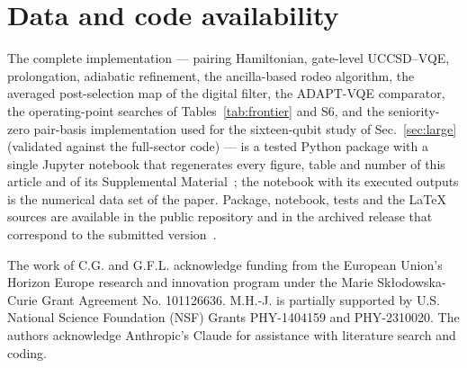 \documentclass[
  aps,            %
  prc,            %
  reprint,        %
  superscriptaddress,
  floatfix,
  nofootinbib
]{revtex4-2}
\newcommand{\SM}{Supplemental Material~\cite{SM}}
\begin{document}
\section*{Data and code availability}
The complete implementation --- pairing Hamiltonian, gate-level UCCSD--VQE,
prolongation, adiabatic refinement, the ancilla-based rodeo algorithm, the
averaged post-selection map of the digital filter, the ADAPT-VQE
comparator, the operating-point searches of Tables~\ref{tab:frontier} and
S6, and the seniority-zero pair-basis implementation used for the
sixteen-qubit study of Sec.~\ref{sec:large} (validated against the
full-sector code) --- is a tested Python package with a single Jupyter
notebook that regenerates every figure, table and number of this article
and of its \SM{}; the notebook with its executed outputs is the numerical
data set of the paper.  Package, notebook, tests and the \LaTeX{} sources
are available in the public repository and in the archived release that
correspond to the submitted version~\cite{Code}.
\begin{acknowledgments}
The work of C.G. and G.F.L. acknowledge funding from the
European Union’s Horizon Europe research and innovation program under the Marie Skłodowska-Curie Grant Agreement No.
101126636. M.H.-J. is partially supported by U.S. National Science Foundation
(NSF) Grants PHY-1404159 and PHY-2310020. 
The authors  acknowledge Anthropic’s Claude
for assistance with literature search and coding.

\end{acknowledgments}
\end{document}
